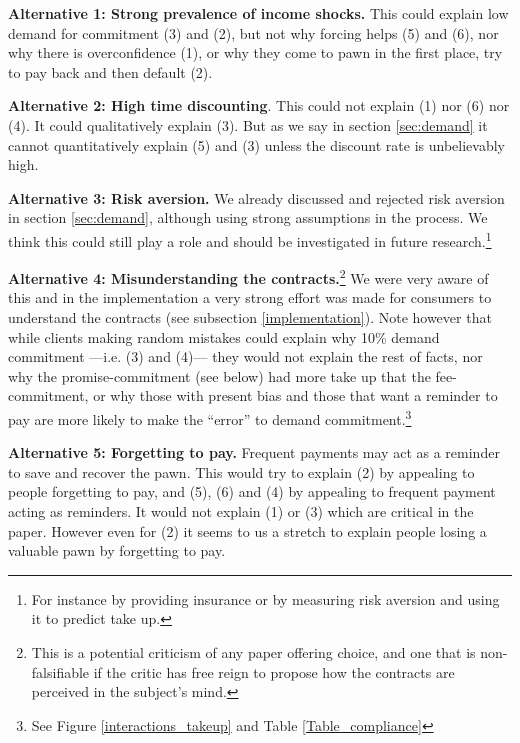 \documentclass[11pt]{article}
\begin{document}
\vspace{.1in}
\noindent \textbf{Alternative 1: Strong prevalence of income shocks.} This could explain low demand for commitment (3) and (2), but not why forcing helps (5) and (6), nor why there is overconfidence (1), or why they come to pawn in the first place, try to pay back and then default (2).

\vspace{.1in}
\noindent \textbf{Alternative 2: High time discounting}. This could not explain (1) nor (6) nor (4). It could qualitatively explain (3). But as we say in section \ref{sec:demand} it cannot quantitatively explain (5) and (3) unless the discount rate is unbelievably high.

\vspace{.1in}
\noindent \textbf{Alternative 3: Risk aversion.} We already discussed and rejected risk aversion in section \ref{sec:demand}, although using strong assumptions in the process. We think this could still play a role and should be investigated in future research.\footnote{For instance by  providing insurance or by measuring risk aversion and using it to predict take up.}

\vspace{.1in}
\noindent \textbf{Alternative 4: Misunderstanding the contracts.}\footnote{This is a potential criticism of any paper offering choice, and one that is non-falsifiable if the critic has free reign to propose how the contracts are perceived in the subject's mind.} We were very aware of this and in the implementation a very strong effort was made for consumers to understand the contracts (see subsection \ref{implementation}). Note however that while clients making random mistakes could explain why 10\% demand commitment ---i.e. (3) and (4)--- they would not explain the rest of facts, nor why the promise-commitment (see below) had more take up that the fee-commitment, or why those with present bias and those that want a reminder to pay are more likely to make the ``error'' to demand commitment.\footnote{See Figure \ref{interactions_takeup} and Table \ref{Table_compliance}} 

\vspace{.1in}
\noindent \textbf{Alternative 5: Forgetting to pay.} Frequent payments may act as a reminder to save and recover the pawn. This would try to explain (2) by appealing to people forgetting to pay, and (5), (6) and (4) by appealing to frequent payment acting as reminders. It would not explain (1) or (3) which are critical in the paper. However even for (2) it seems to us a stretch to explain people losing a valuable pawn by forgetting to pay. 
\end{document}
